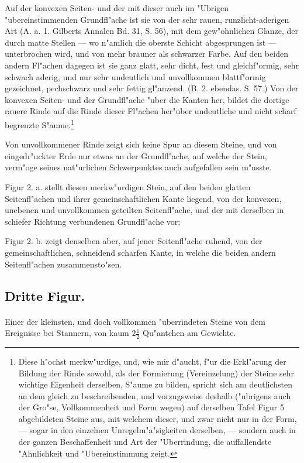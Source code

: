 \documentclass[a4paper, 11pt, oneside, german]{article}
\begin{document}
Auf der konvexen Seiten- und der mit dieser auch im "Ubrigen "ubereinstimmenden Grundfl"ache ist sie von der sehr rauen, runzlicht-aderigen Art (A. a. 1. Gilberts Annalen Bd. 31, S. 56), mit dem gew"ohnlichen Glanze, der durch matte Stellen --- wo n"amlich die oberste Schicht abgesprungen ist --- unterbrochen wird, und von mehr brauner als schwarzer Farbe. Auf den beiden andern Fl"achen dagegen ist sie ganz glatt, sehr dicht, fest und gleichf"ormig, sehr schwach aderig, und nur sehr undeutlich und unvollkommen blattf"ormig gezeichnet, pechschwarz und sehr fettig gl"anzend. (B. 2. ebendas. S. 57.) Von der konvexen Seiten- und der Grundfl"ache "uber die Kanten her, bildet die dortige rauere Rinde auf die Rinde dieser Fl"achen her"uber undeutliche und nicht scharf begrenzte S"aume.\footnote{Diese h"ochst merkw"urdige, und, wie mir d"aucht, f"ur die Erkl"arung der Bildung der Rinde sowohl, als der Formierung (Vereinzelung) der Steine sehr wichtige Eigenheit derselben, S"aume zu bilden, spricht sich am deutlichsten an dem gleich zu beschreibenden, und vorzugsweise deshalb ("ubrigens auch der Gro"se, Vollkommenheit und Form wegen) auf derselben Tafel Figur 5 abgebildeten Steine aus, mit welchem dieser, und zwar nicht nur in der Form, --- sogar in den einzelnen Unregelm"a"sigkeiten derselben, --- sondern auch in der ganzen Beschaffenheit und Art der "Uberrindung, die auffallendste "Ahnlichkeit und "Ubereinstimmung zeigt.}

Von unvollkommener Rinde zeigt sich keine Spur an diesem Steine, und von eingedr"uckter Erde nur etwas an der Grundfl"ache, auf welche der Stein, verm"oge seines nat"urlichen Schwerpunktes auch aufgefallen sein m"usste.

Figur 2. a. stellt diesen merkw"urdigen Stein, auf den beiden glatten Seitenfl"achen und ihrer gemeinschaftlichen Kante liegend, von der konvexen, unebenen und unvollkommen geteilten Seitenfl"ache, und der mit derselben in schiefer Richtung verbundenen Grundfl"ache vor;

Figur 2. b. zeigt denselben aber, auf jener Seitenfl"ache ruhend, von der gemeinschaftlichen, schneidend scharfen Kante, in welche die beiden andern Seitenfl"achen zusammensto"sen.

\subsection{Dritte Figur.}
\paragraph{}
Einer der kleinsten, und doch vollkommen "uberrindeten Steine von dem Ereignisse bei Stannern, von kaum $2\frac{1}{2}$ Qu"antchen am Gewichte.
\end{document}
